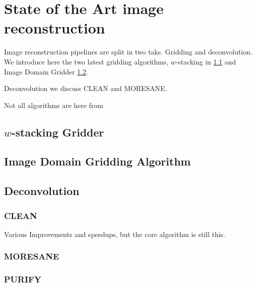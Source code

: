 \section{State of the Art image reconstruction}\label{state}

Image reconstruction pipelines are split in two taks. Gridding and deconvolution. We introduce here the two latest gridding algorithms, $w$-stacking in \ref{state:wstack} and Image Domain Gridder \ref{state:idg}.

Deconvolution we discuss CLEAN and MORESANE.

Not all algorithms are here from

\subsection{$w$-stacking Gridder}\label{state:wstack}

\subsection{Image Domain Gridding Algorithm}\label{state:idg}

\subsection{Deconvolution}

\subsubsection{CLEAN}

Various Improvements and speedups\cite{clark1980efficient, schwab1984relaxing, rau2011multi, offringa2017optimized}, but the core algorithm is still this.

\subsubsection{MORESANE}

\subsubsection{PURIFY}



